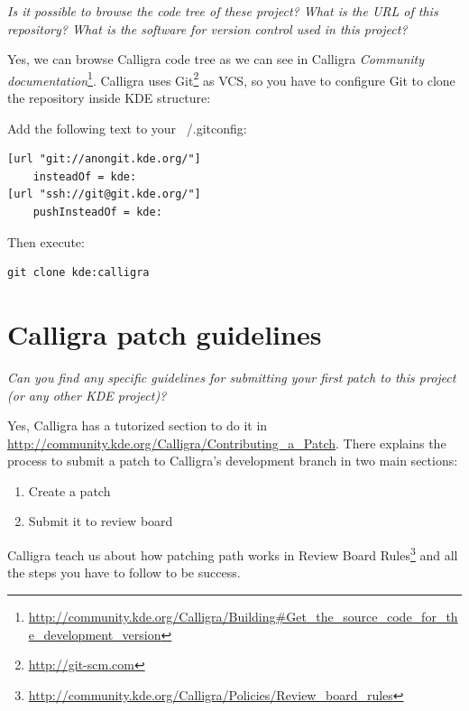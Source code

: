 \documentclass[11pt]{scrartcl}
\begin{document}
\emph{Is it possible to browse the code tree of these project? What is the URL of this repository? What is the software for version control used in this project?}

\par Yes, we can browse Calligra code tree as we can see in Calligra \emph{Community documentation}\footnote{\url{http://community.kde.org/Calligra/Building\#Get_the_source_code_for_the_development_version}}. Calligra uses Git\footnote{\url{http://git-scm.com}} as VCS, so you have to configure Git to clone the repository inside KDE structure:

Add the following text to your ~/.gitconfig:
\begin{Verbatim}[frame=single]
[url "git://anongit.kde.org/"]
    insteadOf = kde:
[url "ssh://git@git.kde.org/"]
    pushInsteadOf = kde:
\end{Verbatim}

Then execute:
\begin{Verbatim}[frame=single]
 git clone kde:calligra
\end{Verbatim}

\section{Calligra patch guidelines}
\label{sec:q-02}

\emph{Can you find any specific guidelines for submitting your first patch to this project (or any other KDE project)?}

\par Yes, Calligra has a tutorized section to do it in \url{http://community.kde.org/Calligra/Contributing_a_Patch}.
There explains the process to submit a patch to Calligra's development branch in two main sections:

\begin{enumerate}
	\item Create a patch
	\item Submit it to review board
\end{enumerate}

\par Calligra teach us about how patching path works in Review Board Rules\footnote{\url{http://community.kde.org/Calligra/Policies/Review_board_rules}} and all the steps you have to follow to be success.
\end{document}
